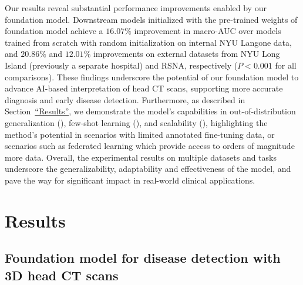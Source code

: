 \documentclass[fleqn,10pt]{wlscirep}
\begin{document}
Our results reveal substantial performance improvements enabled by our foundation model. Downstream models initialized with the pre-trained weights of foundation model achieve a $16.07\%$ improvement in macro-AUC over models trained from scratch with random initialization on internal NYU Langone data, and $20.86\%$ and $12.01\%$ improvements on external datasets from NYU Long Island (previously a separate hospital) and RSNA, respectively ($P<0.001$ for all comparisons). These findings underscore the potential of our foundation model to advance AI-based interpretation of head CT scans, supporting more accurate diagnosis and early disease detection. Furthermore, as described in Section~\hyperref[sec:results]{``Results''}, we demonstrate the model’s capabilities in out-of-distribution generalization (), few-shot learning (), and scalability (), highlighting the method’s potential in scenarios with limited annotated fine-tuning data, or scenarios such as federated learning which provide access to orders of magnitude more data. Overall, the experimental results on multiple datasets and tasks underscore the generalizability, adaptability and effectiveness of the model, and pave the way for significant impact in real-world clinical applications.






\section*{Results}
\label{sec:results}
\subsection*{Foundation model for disease detection with 3D head CT scans}
\end{document}
